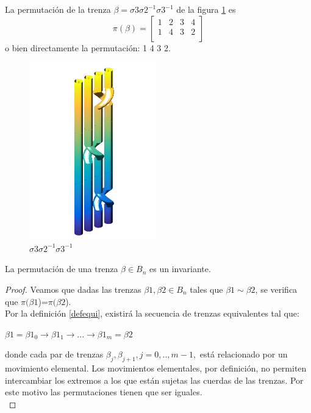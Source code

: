 La permutación de la trenza $\beta = \sigma3\sigma2^{-1}\sigma3^{-1}$ de la figura \ref{perm1} es \[\pi(\beta)=\begin{bmatrix}
1 & 2 & 3 & 4\\
1 & 4 & 3 & 2 \\
\end{bmatrix}\] o bien directamente la permutación: 1 4 3 2.\\
\begin{figure}[h!]
	\centering
	\includegraphics[width=5.5cm]{itrenzas/4c3.png}
	\caption{$\sigma3\sigma2^{-1}\sigma3^{-1}$}
	\label{perm1} 
\end{figure}

\begin{pro}
    La permutación de una trenza $\beta \in B_{n}$ es un invariante. 
    \begin{proof}
    	Veamos que dadas las trenzas $\beta1,\beta2 \in B_{n}$ tales que $\beta1 \sim \beta2$, se verifica que $\pi(\beta1$)=$\pi(\beta2$).\\
    	
    	Por la definición \ref{defequi}, existirá la secuencia de trenzas equivalentes tal que: 
    	\begin{center}
    		$ \beta1 = \beta1_{0} \rightarrow \beta1_{1} \rightarrow ... \rightarrow \beta1_{m}=\beta2$ 
    	\end{center}
    	donde cada par de trenzas $ \beta_{j}, \beta_{j+1}, j=0,..,m-1, $ está relacionado por un movimiento elemental. Los movimientos elementales, por definición, no permiten intercambiar los extremos a los que están sujetas las cuerdas de las trenzas. Por este motivo las permutaciones tienen que ser iguales. \\
    \end{proof}
\end{pro}

